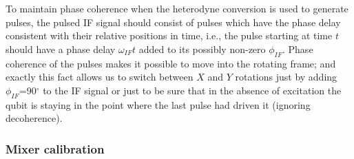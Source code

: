 To maintain phase coherence when the heterodyne conversion is used to generate pulses, the pulsed IF signal should consist of pulses which have the phase delay consistent with their relative positions in time, i.e., the pulse starting at time $t$ should have a phase delay $\omega_{IF}t$ added to its possibly non-zero $\phi_{IF}$. Phase coherence of the pulses makes it possible to move into the rotating frame; and exactly this fact allows us to switch between $X$ and $Y$ rotations just by adding $\phi_{IF}$=90$^\circ$ to the IF signal or just to be sure that in the absence of excitation the qubit is staying in the point where the last pulse had driven it (ignoring decoherence).

\subsubsection{Mixer calibration}

